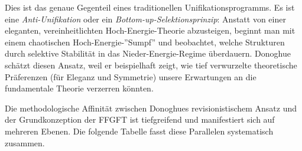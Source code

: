 	Dies ist das genaue Gegenteil eines traditionellen Unifikationsprogramms. Es ist eine \emph{Anti-Unifikation} oder ein \emph{Bottom-up-Selektionsprinzip}: Anstatt von einer eleganten, vereinheitlichten Hoch-Energie-Theorie abzusteigen, beginnt man mit einem chaotischen Hoch-Energie-''Sumpf'' und beobachtet, welche Strukturen durch selektive Stabilität in das Nieder-Energie-Regime überdauern. Donoghue schätzt diesen Ansatz, weil er beispielhaft zeigt, wie tief verwurzelte theoretische Präferenzen (für Eleganz und Symmetrie) unsere Erwartungen an die fundamentale Theorie verzerren könnten.
	
	
	Die methodologische Affinität zwischen Donoghues revisionistischem Ansatz und der Grundkonzeption der FFGFT ist tiefgreifend und manifestiert sich auf mehreren Ebenen. Die folgende Tabelle fasst diese Parallelen systematisch zusammen.
	
